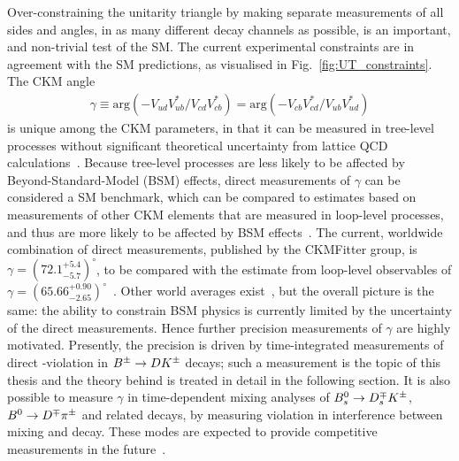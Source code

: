 Over-constraining the unitarity triangle by making separate measurements of all sides and angles, in as many different decay channels as possible, is an important, and non-trivial test of the SM. The current experimental constraints are in agreement with the SM predictions, as visualised in Fig.~\ref{fig:UT_constraints}. 
The CKM angle
\begin{align}\label{eq:gamma_definition}
    \gamma \equiv \mathrm{arg} (-V_{ud}^{\phantom{*}}V_{ub}^*/V_{cd}^{\phantom{*}}V_{cb}^*)
    = \mathrm{arg} (-V_{cb}^{\phantom{*}}V_{cd}^*/V_{ub}^{\phantom{*}}V_{ud}^*)
\end{align}
is unique among the CKM parameters, in that it can be measured in tree-level processes without significant theoretical uncertainty from lattice QCD calculations~\cite{brodUltimateTheoreticalError2014}.  Because tree-level processes are less likely to be affected by Beyond-Standard-Model (BSM) effects, direct measurements of $\gamma$ can be considered a SM benchmark, which can be compared to estimates based on measurements of other CKM elements that are measured in loop-level processes, and thus are more likely to be affected by BSM effects~\cite{blankeEmergingDeltaAnomaly2019}. 
The current, worldwide combination of direct measurements, published by the CKMFitter group, is $\gamma = (72.1^{+5.4}_{-5.7})^\circ $, to be compared with the estimate from loop-level observables of $\gamma = (65.66^{+0.90}_{-2.65})^\circ $~\cite{CKMfitter2015}. Other world averages exist~\cite{HFLAV,UTfit-UT}, but the overall picture is the same: the ability to constrain BSM physics is currently limited by the uncertainty of the direct measurements. Hence further precision measurements of $\gamma$ are highly motivated. Presently, the precision is driven by time-integrated measurements of direct \CP-violation in ${{B}^\pm}\rightarrow{\ensuremath{D}}{\ensuremath{{K}^\pm}}$ decays; such a measurement is the topic of this thesis and the theory behind is treated in detail in the following section. It is also possible to measure $\gamma$ in time-dependent mixing analyses of ${{B}^0_{s}}\rightarrow{\ensuremath{{D}^{\mp}_{s}}}{\ensuremath{{K}^\pm}}$, ${{B}^0}\rightarrow{\ensuremath{{D}^\mp}}{\ensuremath{{\pi}^\pm}}$ and related decays, by measuring \CP violation in interference between mixing and decay. These modes are expected to provide competitive measurements in the future~\cite{kouBelleIIPhysics2019,lhcbcollaborationPhysicsCaseLHCb2019}.



